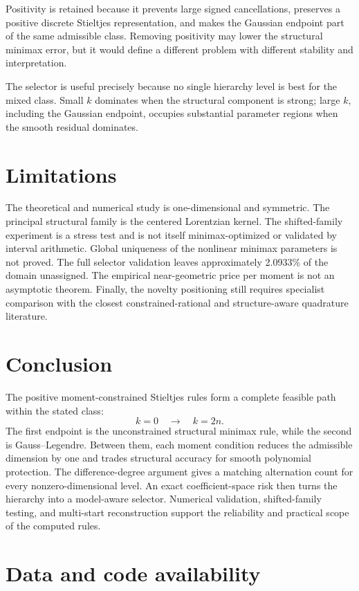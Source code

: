 \documentclass[preprint,12pt]{elsarticle}
\theoremstyle{remark}
\begin{document}
Positivity is retained because it prevents large signed cancellations,
preserves a positive discrete Stieltjes representation, and makes the
Gaussian endpoint part of the same admissible class. Removing positivity
may lower the structural minimax error, but it would define a different
problem with different stability and interpretation.

The selector is useful precisely because no single hierarchy level is
best for the mixed class. Small \(k\) dominates when the structural
component is strong; large \(k\), including the Gaussian endpoint,
occupies substantial parameter regions when the smooth residual
dominates.

\section{Limitations}

The theoretical and numerical study is one-dimensional and symmetric.
The principal structural family is the centered Lorentzian kernel.
The shifted-family experiment is a stress test and is not itself
minimax-optimized or validated by interval arithmetic. Global uniqueness
of the nonlinear minimax parameters is not proved. The full selector
validation leaves approximately 2.0933\% of the domain
unassigned. The empirical near-geometric price per moment is not an
asymptotic theorem. Finally, the novelty positioning still requires
specialist comparison with the closest constrained-rational and
structure-aware quadrature literature.

\section{Conclusion}

The positive moment-constrained Stieltjes rules form a complete feasible
path within the stated class:
\[
k=0
\quad\longrightarrow\quad
k=2n.
\]
The first endpoint is the unconstrained structural minimax rule, while
the second is Gauss--Legendre. Between them, each moment condition
reduces the admissible dimension by one and trades structural accuracy
for smooth polynomial protection. The difference-degree argument gives
a matching alternation count for every nonzero-dimensional level.
An exact coefficient-space risk then turns the hierarchy into a
model-aware selector. Numerical validation, shifted-family testing, and
multi-start reconstruction support the reliability and practical scope
of the computed rules.

\section*{Data and code availability}
\end{document}
